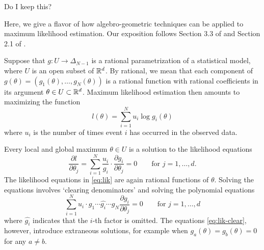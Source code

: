 \documentclass[cclicense]{hmcthesis}
\numberwithin{equation}{chapter}
\numberwithin{thmcounter}{chapter}
\begin{document}
    Do I keep this?

    Here, we give a flavor of how algebro-geometric techniques can be applied to
    maximum likelihood estimation.  Our exposition follows Section 3.3 of
    \citep{ASCB} and Section 2.1 of \citep{DSS08}.

    Suppose that $g: U \to \Delta_{N-1}$ is a rational parametrization of a
    statistical model, where $U$ is an open subset of $\mathbb{R}^d$.  By rational, we
    mean that each component of $g(\theta) = (g_1(\theta), \ldots, g_N(\theta))$
    is a rational function with rational coefficients in its argument $\theta
    \in U \subset \mathbb{R}^d$.  Maximum likelihood estimation then amounts to
    maximizing the function
    \[
        l(\theta) = \sum_{i=1}^N u_i \log g_i(\theta)
    \] 
    where $u_i$ is the number of times event $i$ has occurred in the observed
    data.

    Every local and global maximum $\theta \in U$ is a solution to the
    likelihood equations
    \begin{equation}\label{eq:lik}
        \frac{\partial l}{\partial\theta_j}
        =
        \sum_{i=1}^N 
        \frac{u_i}{g_i} 
        \cdot
        \frac{\partial g_i}{\partial \theta_j}
        = 0
        \qquad
        \text{for $j = 1,\ldots,d$}.
    \end{equation}
    The likelihood equations in \eqref{eq:lik} are again rational functions of
    $\theta$.  Solving the equations involves `clearing denominators' and
    solving the polynomial equations
    \begin{equation}\label{eq:lik-clear}
        \sum_{i=1}^N 
        u_i \cdot g_1 \cdots \widehat{g_i} \cdots g_N
        \frac{\partial g_i}{\partial \theta_j}
        = 0
        \qquad
        \text{for $j = 1, \ldots, d$}
    \end{equation}
    where $\widehat{g_i}$ indicates that the $i$-th factor is omitted.  The
    equations \eqref{eq:lik-clear}, however, introduce extraneous solutions, for
    example when $g_a(\theta) = g_b(\theta) = 0$ for any $a \ne b$.
\end{document}
